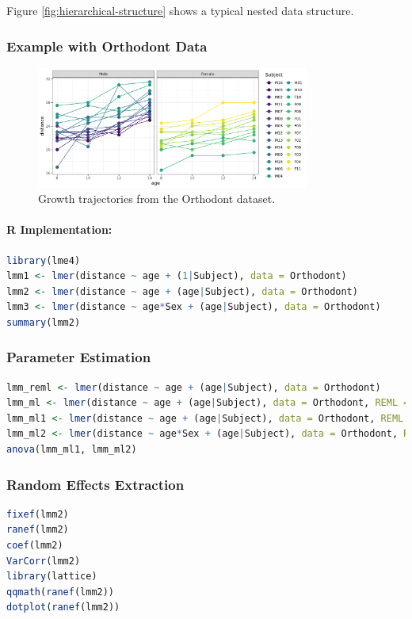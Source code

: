 \documentclass[11pt,a4paper]{article}
\begin{document}
Figure \ref{fig:hierarchical-structure} shows a typical nested data structure.

\subsubsection{Example with Orthodont Data}
\begin{figure}[htb]
    \centering
    \includegraphics[width=0.8\textwidth]{orthodont-trajectories.png}
    \caption{Growth trajectories from the Orthodont dataset.}
    \label{fig:orthodont-trajectories}
\end{figure}

\paragraph{R Implementation:}
\begin{lstlisting}[language=R]
library(lme4)
lmm1 <- lmer(distance ~ age + (1|Subject), data = Orthodont)
lmm2 <- lmer(distance ~ age + (age|Subject), data = Orthodont)
lmm3 <- lmer(distance ~ age*Sex + (age|Subject), data = Orthodont)
summary(lmm2)
\end{lstlisting}

\subsubsection{Parameter Estimation}
\begin{lstlisting}[language=R]
lmm_reml <- lmer(distance ~ age + (age|Subject), data = Orthodont)
lmm_ml <- lmer(distance ~ age + (age|Subject), data = Orthodont, REML = FALSE)
lmm_ml1 <- lmer(distance ~ age + (age|Subject), data = Orthodont, REML = FALSE)
lmm_ml2 <- lmer(distance ~ age*Sex + (age|Subject), data = Orthodont, REML = FALSE)
anova(lmm_ml1, lmm_ml2)
\end{lstlisting}

\subsubsection{Random Effects Extraction}
\begin{lstlisting}[language=R]
fixef(lmm2)
ranef(lmm2)
coef(lmm2)
VarCorr(lmm2)
library(lattice)
qqmath(ranef(lmm2))
dotplot(ranef(lmm2))
\end{lstlisting}
\end{document}
